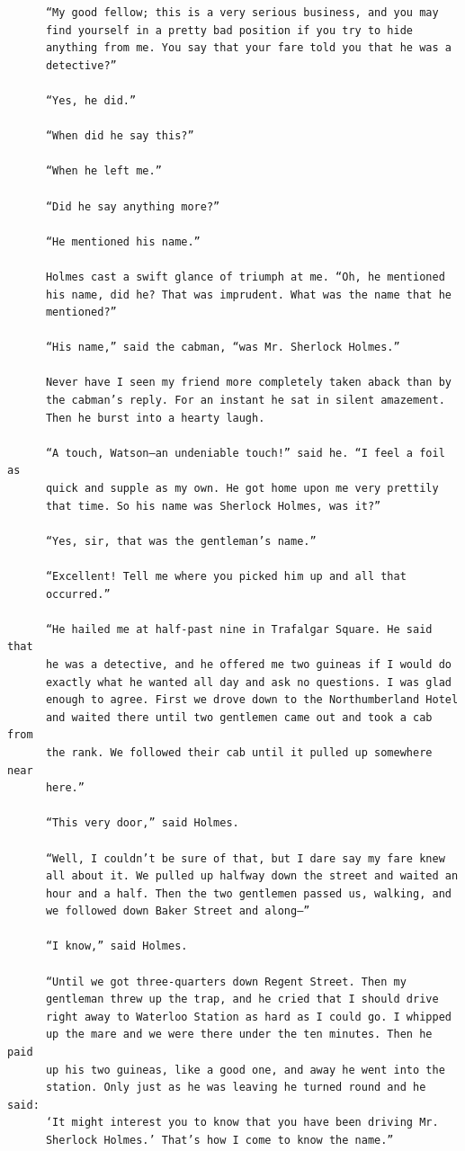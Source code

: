 \documentclass{article}
\begin{document}
\begin{verbatim}
      “My good fellow; this is a very serious business, and you may
      find yourself in a pretty bad position if you try to hide
      anything from me. You say that your fare told you that he was a
      detective?”

      “Yes, he did.”

      “When did he say this?”

      “When he left me.”

      “Did he say anything more?”

      “He mentioned his name.”

      Holmes cast a swift glance of triumph at me. “Oh, he mentioned
      his name, did he? That was imprudent. What was the name that he
      mentioned?”

      “His name,” said the cabman, “was Mr. Sherlock Holmes.”

      Never have I seen my friend more completely taken aback than by
      the cabman’s reply. For an instant he sat in silent amazement.
      Then he burst into a hearty laugh.

      “A touch, Watson—an undeniable touch!” said he. “I feel a foil as
      quick and supple as my own. He got home upon me very prettily
      that time. So his name was Sherlock Holmes, was it?”

      “Yes, sir, that was the gentleman’s name.”

      “Excellent! Tell me where you picked him up and all that
      occurred.”

      “He hailed me at half-past nine in Trafalgar Square. He said that
      he was a detective, and he offered me two guineas if I would do
      exactly what he wanted all day and ask no questions. I was glad
      enough to agree. First we drove down to the Northumberland Hotel
      and waited there until two gentlemen came out and took a cab from
      the rank. We followed their cab until it pulled up somewhere near
      here.”

      “This very door,” said Holmes.

      “Well, I couldn’t be sure of that, but I dare say my fare knew
      all about it. We pulled up halfway down the street and waited an
      hour and a half. Then the two gentlemen passed us, walking, and
      we followed down Baker Street and along—”

      “I know,” said Holmes.

      “Until we got three-quarters down Regent Street. Then my
      gentleman threw up the trap, and he cried that I should drive
      right away to Waterloo Station as hard as I could go. I whipped
      up the mare and we were there under the ten minutes. Then he paid
      up his two guineas, like a good one, and away he went into the
      station. Only just as he was leaving he turned round and he said:
      ‘It might interest you to know that you have been driving Mr.
      Sherlock Holmes.’ That’s how I come to know the name.”


\end{verbatim}
\end{document}
